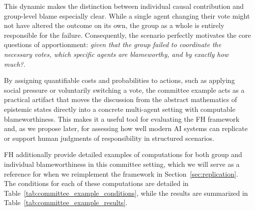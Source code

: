 \documentclass{article}
\begin{document}

This dynamic makes the distinction between individual causal contribution and group-level blame especially clear. While a single agent changing their vote might not have altered the outcome on its own, the group as a whole is entirely responsible for the failure. Consequently, the scenario perfectly motivates the core questions of apportionment: \textit{given that the group failed to coordinate the necessary votes, which specific agents are blameworthy, and by exactly how much?}.

By assigning quantifiable costs and probabilities to actions, such as applying social pressure or voluntarily switching a vote, the committee example acts as a practical artifact that moves the discussion from the abstract mathematics of epistemic states directly into a concrete multi-agent setting with computable blameworthiness. This makes it a useful tool for evaluating the FH framework and, as we propose later, for assessing how well modern AI systems can replicate or support human judgments of responsibility in structured scenarios.

FH additionally provide detailed examples of computations for both group and individual blameworthiness in this committee setting, which we will serve as a reference for when we reimplement the framework in Section~\ref{sec:replication}. The conditions for each of these computations are detailed in Table~\ref{tab:committee_example_conditions}, while the results are summarized in Table~\ref{tab:committee_example_results}.
\end{document}
